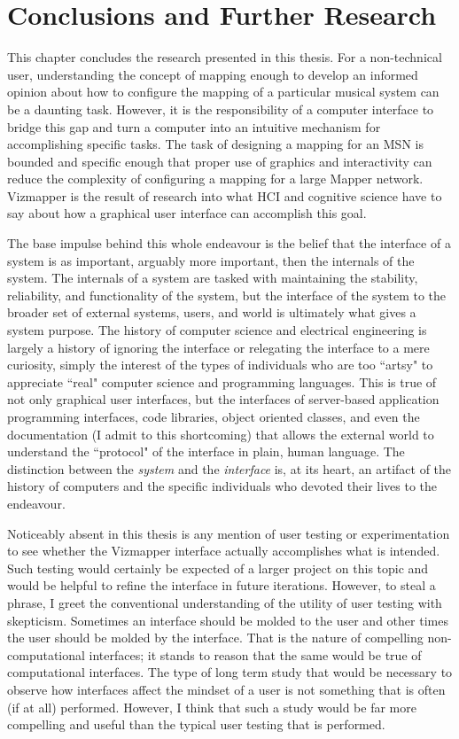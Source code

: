 \resetdatestamp

\chapter{Conclusions and Further Research}

This chapter concludes the research presented in this thesis. For a non-technical user, understanding the concept of mapping enough to develop an informed opinion about how to configure the mapping of a particular musical system can be a daunting task. However, it is the responsibility of a computer interface to bridge this gap and turn a computer into an intuitive mechanism for accomplishing specific tasks. The task of designing a mapping for an MSN is bounded and specific enough that proper use of graphics and interactivity can reduce the complexity of configuring a mapping for a large Mapper network. Vizmapper is the result of research into what HCI and cognitive science have to say about how a graphical user interface can accomplish this goal.

The base impulse behind this whole endeavour is the belief that the interface of a system is as important, arguably more important, then the internals of the system. The internals of a system are tasked with maintaining the stability, reliability, and functionality of the system, but the interface of the system to the broader set of external systems, users, and world is ultimately what gives a system purpose. The history of computer science and electrical engineering is largely a history of ignoring the interface or relegating the interface to a mere curiosity, simply the interest of the types of individuals who are too ``artsy" to appreciate ``real" computer science and programming languages. This is true of not only graphical user interfaces, but the interfaces of server-based application programming interfaces, code libraries, object oriented classes, and even the documentation (I admit to this shortcoming) that allows the external world to understand the ``protocol" of the interface in plain, human language. The distinction between the \emph{system} and the \emph{interface} is, at its heart, an artifact of the history of computers and the specific individuals who devoted their lives to the endeavour.

Noticeably absent in this thesis is any mention of user testing or experimentation to see whether the Vizmapper interface actually accomplishes what is intended. Such testing would certainly be expected of a larger project on this topic and would be helpful to refine the interface in future iterations. However, to steal a phrase, I greet the conventional understanding of the utility of user testing with skepticism. Sometimes an interface should be molded to the user and other times the user should be molded by the interface. That is the nature of compelling non-computational interfaces; it stands to reason that the same would be true of computational interfaces. The type of long term study that would be necessary to observe how interfaces affect the mindset of a user is not something that is often (if at all) performed. However, I think that such a study would be far more compelling and useful than the typical user testing that is performed.

